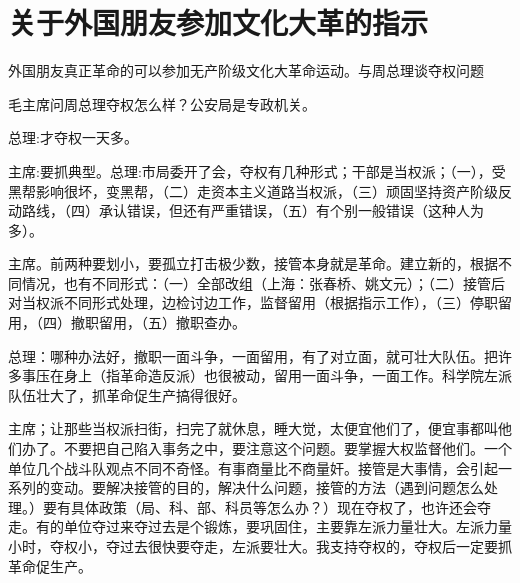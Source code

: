 \section[关于外国朋友参加文化大革的指示（一九六七年一月二十八日）]{关于外国朋友参加文化大革的指示}


外国朋友真正革命的可以参加无产阶级文化大革命运动。与周总理谈夺权问题


毛主席问周总理夺权怎么样？公安局是专政机关。

总理:才夺权一天多。

主席:要抓典型。总理:市局委开了会，夺权有几种形式；干部是当权派；（一），受黑帮影响很坏，变黑帮，（二）走资本主义道路当权派，（三）顽固坚持资产阶级反动路线，（四）承认错误，但还有严重错误，（五）有个别一般错误（这种人为多）。

主席。前两种要划小，要孤立打击极少数，接管本身就是革命。建立新的，根据不同情况，也有不同形式：（一）全部改组（上海：张春桥、姚文元）；（二）接管后对当权派不同形式处理，边检讨边工作，监督留用（根据指示工作），（三）停职留用，（四）撤职留用，（五）撤职查办。

总理：哪种办法好，撤职一面斗争，一面留用，有了对立面，就可壮大队伍。把许多事压在身上（指革命造反派）也很被动，留用一面斗争，一面工作。科学院左派队伍壮大了，抓革命促生产搞得很好。

主席；让那些当权派扫街，扫完了就休息，睡大觉，太便宜他们了，便宜事都叫他们办了。不要把自己陷入事务之中，要注意这个问题。要掌握大权监督他们。一个单位几个战斗队观点不同不奇怪。有事商量比不商量奸。接管是大事情，会引起一系列的变动。要解决接管的目的，解决什么问题，接管的方法（遇到问题怎么处理。）要有具体政策（局、科、部、科员等怎么办？）现在夺权了，也许还会夺走。有的单位夺过来夺过去是个锻炼，要巩固住，主要靠左派力量壮大。左派力量小时，夺权小，夺过去很快要夺走，左派要壮大。我支持夺权的，夺权后一定要抓革命促生产。

